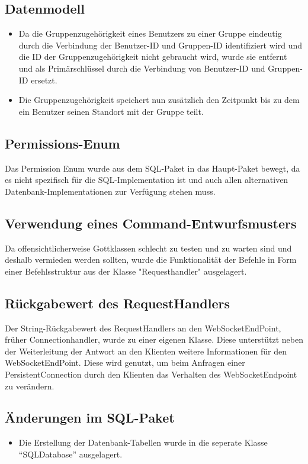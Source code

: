 \documentclass[parskip=full,11pt]{scrartcl}
\begin{document}
\subsection{Datenmodell}
	\begin{itemize}
	\item Da die Gruppenzugehörigkeit eines Benutzers zu einer Gruppe eindeutig
		durch die Verbindung der Benutzer-ID und Gruppen-ID identifiziert wird
		und die ID der Gruppenzugehörigkeit nicht gebraucht wird, wurde sie
		entfernt und als Primärschlüssel durch die Verbindung von Benutzer-ID
		und Gruppen-ID ersetzt.
	\item Die Gruppenzugehörigkeit speichert nun zusätzlich den Zeitpunkt bis
		zu dem ein Benutzer seinen Standort mit der Gruppe teilt.
	\end{itemize}

\subsection{Permissions-Enum}
Das Permission Enum wurde aus dem SQL-Paket in das Haupt-Paket bewegt, da es
nicht spezifisch für die SQL-Implementation ist und auch allen alternativen
Datenbank-Implementationen zur Verfügung stehen muss.

\subsection{Verwendung eines Command-Entwurfsmusters}
Da offensichtlicherweise Gottklassen schlecht zu testen und zu warten sind und
deshalb vermieden werden sollten, wurde die Funktionalität der Befehle in Form
einer Befehlsstruktur aus der Klasse "Requesthandler" ausgelagert.

\subsection{Rückgabewert des RequestHandlers}
Der String-Rückgabewert des RequestHandlers an den WebSocketEndPoint, früher
Connectionhandler, wurde zu einer eigenen Klasse. Diese unterstützt neben der
Weiterleitung der Antwort an den Klienten weitere Informationen für den
WebSocketEndPoint. Diese wird genutzt, um beim Anfragen einer
PersistentConnection durch den Klienten das Verhalten des WebSocketEndpoint zu
verändern.

\subsection{Änderungen im SQL-Paket}
	\begin{itemize}
		\item Die Erstellung der Datenbank-Tabellen wurde in die seperate
			Klasse \enquote{SQLDatabase} ausgelagert.
	\end{itemize}
\end{document}
